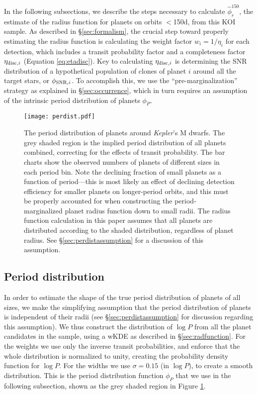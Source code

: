 \documentclass[iop]{emulateapj}
\def\Kepler{\textit{Kepler}}
\def\Pmax{150}
\begin{document}
In the following subsections, we describe the steps necessary to calculate $\hat\phi^{\Pmax}_{r}$, the estimate of the radius function for planets on orbits $<${\Pmax}d, from this KOI sample.  As described in \S\ref{sec:formalism}, the crucial step toward properly estimating the radius function is calculating the weight factor $w_i = 1/\eta_i$ for each detection, which includes a transit probability factor and a completeness factor $\eta_{{\rm disc},i}$ (Equation \ref{eq:etadisc}).  Key to calculating $\eta_{{\rm disc},i}$ is determining the SNR distribution of a hypothetical population of clones of planet $i$ around all the target stars, or $\phi_{{\rm SNR},i}$.  To accomplish this, we use the ``pre-marginalization'' strategy as explained in \S\ref{sec:occurrence}, which in turn requires an assumption of the intrinsic period distribution of planets $\phi_P$.




%
%

\begin{figure}[t!]
   \centering
   \texttt{[image: perdist.pdf]} %
   \caption{The period distribution of planets around \Kepler's M dwarfs.  The grey shaded region is the implied period distribution of all planets combined, correcting for the effects of transit probability.  The bar charts show the observed numbers of planets of different sizes in each period bin.  Note the declining fraction of small planets as a function of period---this is most likely an effect of declining detection efficiency for smaller planets on longer-period orbits, and this must be properly accounted for when constructing the period-marginalized planet radius function down to small radii.  The radius function calculation in this paper assumes that all planets are distributed according to the shaded distribution, regardless of planet radius.  See \S\ref{sec:perdistassumption} for a discussion of this assumption.}
   \label{fig:pdist}
\end{figure}


\subsection{Period distribution}
\label{sec:perdist}

In order to estimate the shape of the true period distribution of planets of all sizes, we make the simplifying assumption that the period distribution of planets is independent of their radii (see \S\ref{sec:perdistassumption} for discussion regarding this assumption).  We thus construct the distribution of $\log P$ from all the planet candidates in the sample, using a wKDE  as described in \S\ref{sec:radfunction}.   For the weights we use only the inverse transit probabilities, and enforce that the whole distribution is normalized to unity, creating the probability density function for $\log P$.  For the widths we use $\sigma = 0.15$ (in $\log P$), to create a smooth distribution.  This is the period distribution function $\phi_P$ that we use in the following subsection, shown as the grey shaded region in Figure \ref{fig:pdist}.
\end{document}
